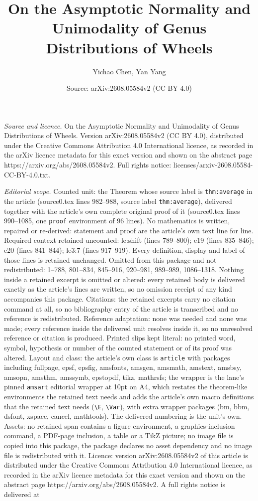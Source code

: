 \documentclass[10pt,a4paper]{amsart}
\title[On the Asymptotic Normality and Unimodality of Genus Distrib]{On the Asymptotic Normality and Unimodality of Genus Distributions of Wheels}
\author{Yichao Chen, Yan Yang}
\date{Source: arXiv:2608.05584v2 (CC BY 4.0)}
\begin{document}
\maketitle

\noindent\emph{Source and licence.} On the Asymptotic Normality and Unimodality of Genus Distributions of Wheels. Version arXiv:2608.05584v2 (CC BY 4.0), distributed under the Creative Commons Attribution 4.0 International licence, as recorded in the arXiv licence metadata for this exact version and shown on the abstract page https://arxiv.org/abs/2608.05584v2. Full rights notice: licenses/arxiv-2608.05584-CC-BY-4.0.txt.\par\smallskip

\noindent\textit{Editorial scope.} Counted unit: the Theorem whose source label is \texttt{thm:average} in the article (source0.tex lines 982--988, source label \texttt{thm:average}), delivered together with the article's own complete original proof of it (source0.tex lines 990--1085, one \texttt{proof} environment of 96 lines). No mathematics is written, repaired or re-derived: statement and proof are the article's own text line for line. Required context retained uncounted: le:shift (lines 789--800); e19 (lines 835--846); e20 (lines 841--844); le3:7 (lines 917--919). Every definition, display and label of those lines is retained unchanged. Omitted from this package and not redistributed: 1--788, 801--834, 845--916, 920--981, 989--989, 1086--1318. Nothing inside a retained excerpt is omitted or altered: every retained body is delivered exactly as the article's lines are written, so no omission receipt of any kind accompanies this package. Citations: the retained excerpts carry no citation command at all, so no bibliography entry of the article is transcribed and no reference is redistributed. Reference adaptation: none was needed and none was made; every reference inside the delivered unit resolves inside it, so no unresolved reference or citation is produced. Printed slips kept literal: no printed word, symbol, hypothesis or number of the counted statement or of its proof was altered. Layout and class: the article's own class is \texttt{article} with packages including fullpage, epsf, epsfig, amsfonts, amsgen, amsmath, amstext, amsbsy, amsopn, amsthm, amssymb, epstopdf, tikz, mathrsfs; the wrapper is the lane's pinned \texttt{amsart} editorial wrapper at 10pt on A4, which restates the theorem-like environments the retained text needs and adds the article's own macro definitions that the retained text needs (\texttt{\textbackslash E}, \texttt{\textbackslash Var}), with extra wrapper packages (bm, bbm, dsfont, xspace, cancel, mathtools). The delivered numbering is the unit's own. Assets: no retained span contains a figure environment, a graphics-inclusion command, a PDF-page inclusion, a table or a TikZ picture; no image file is copied into this package, the package declares no asset dependency and no image file is redistributed with it. Licence: version arXiv:2608.05584v2 of this article is distributed under the Creative Commons Attribution 4.0 International licence, as recorded in the arXiv licence metadata for this exact version and shown on the abstract page https://arxiv.org/abs/2608.05584v2. A full rights notice is delivered at 
\end{document}
